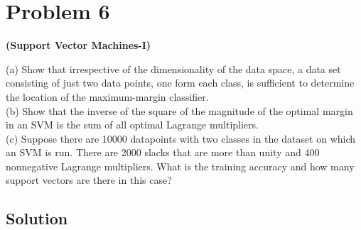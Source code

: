 \section*{Problem 6}

\textbf{(Support Vector Machines-I)}

(a) Show that irrespective of the dimensionality of the data space, a data set consisting of just two data points, one form each class, is sufficient to determine the location of the maximum-margin classifier.\\
(b) Show that the inverse of the square of the magnitude of the optimal margin in an SVM is the sum of all optimal Lagrange multipliers.\\
(c) Suppose there are 10000 datapoints with two classes in the dataset on which an SVM is run. There are 2000 slacks that are more than unity and 400 nonnegative Lagrange multipliers. What is the training accuracy and how many support vectors are there in this case?

\subsection*{Solution}
